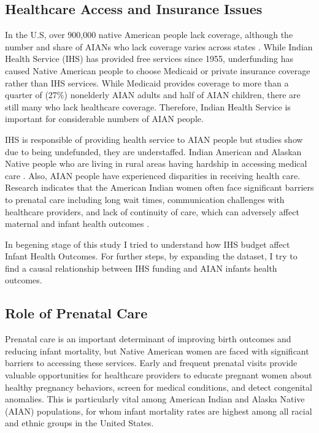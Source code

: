 \documentclass[12pt]{article}
\begin{document}
\subsection{Healthcare Access and Insurance Issues}

In the U.S, over 900,000 native American people lack coverage, although
the number and share of AIANs who lack coverage varies across states
\citep{artiga2017}. While Indian Health Service (IHS) has
provided free services since 1955, underfunding has caused Native
American people to choose Medicaid or private insurance coverage rather
than IHS services. While Medicaid provides coverage to more than a
quarter of (27\%) nonelderly AIAN adults and half of AIAN children, there
are still many who lack healthcare coverage. Therefore, Indian Health
Service is important for considerable numbers of AIAN people.

IHS is responsible of providing health service to AIAN people but
studies show due to being undefunded, they are understaffed. Indian
American and Alaskan Native people who are living in rural areas having
hardship in accessing medical care \citep{thorsen2023, warne2014}.
Also, AIAN people have experienced disparities in receiving health care.
Research indicates that the American Indian women often face significant
barriers to prenatal care including long wait times,
communication challenges with healthcare providers, and lack of
continuity of care, which can adversely affect maternal and infant
health outcomes \citep{hanson2012}.

In begening stage of this study I tried to understand how IHS budget
affect Infant Health Outcomes. For further steps, by expanding the
dataset, I try to find a causal relationship between IHS funding and
AIAN infants health outcomes.

\subsection{Role of Prenatal Care}

Prenatal care is an important determinant of improving birth outcomes
and reducing infant mortality, but Native American women are faced with
significant barriers to accessing these services. Early and frequent
prenatal visits provide valuable opportunities for healthcare providers
to educate pregnant women about healthy pregnancy behaviors, screen for
medical conditions, and detect congenital anomalies. This is
particularly vital among American Indian and Alaska Native (AIAN)
populations, for whom infant mortality rates are highest among all
racial and ethnic groups in the United States.
\end{document}
